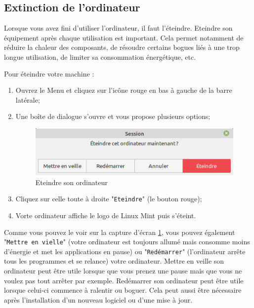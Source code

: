 \documentclass[12pt]{book}
\begin{document}
	\subsection{Extinction de l'ordinateur}
		Lorsque vous avez fini d'utiliser l'ordinateur, il faut l'éteindre. 
		Eteindre son équipement après chaque utilisation est important. 
		Cela permet notamment de réduire la chaleur des composants, de résoudre certains bogues liés à une trop longue utilisation, de limiter sa consommation énergétique, etc.\par
		Pour éteindre votre machine :
		\begin{enumerate}
			\item Ouvrez le Menu et cliquez sur l'icône rouge en bas à gauche de la barre latérale;
			\item Une boîte de dialogue s'ouvre et vous propose plusieurs options;
			\begin{figure}[h]
				\centering
				\includegraphics[width=.51\textwidth]{include/eteindre.png}
				\caption{Eteindre son ordinateur}
				\label{fig:eteindre}
			\end{figure}
			\item Cliquez sur celle toute à droite "\texttt{Eteindre}" (le bouton rouge);
			\item Vorte ordinateur affiche le logo de Linux Mint puis s'éteint.
		\end{enumerate}\par
		Comme vous pouvez le voir sur la capture d'écran \ref{fig:eteindre}, vous pouvez également "\texttt{Mettre en vielle}" (votre ordinateur est toujours allumé mais consomme moins d'énergie et met les applications en pause) ou "\texttt{Redémarrer}" (l'ordinateur arrête tous les programmes et se relance) votre ordinateur.
		Mettre en veille son ordinateur peut être utile lorsque que vous prenez une pause mais que vous ne voulez pas tout arrêter par exemple.
		Redémarrer son ordinateur peut être utile lorsque celui-ci commence à ralentir ou boguer.
		Cela peut aussi être nécessaire après l'installation d'un nouveau logiciel ou d'une mise à jour.
\end{document}
